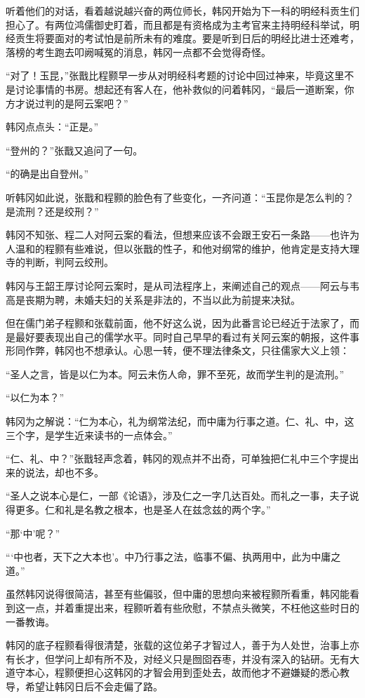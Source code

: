 听着他们的对话，看着越说越兴奋的两位师长，韩冈开始为下一科的明经科贡生们担心了。有两位鸿儒御史盯着，而且都是有资格成为主考官来主持明经科举试，明经贡生将要面对的考试怕是前所未有的难度。要是听到日后的明经比进士还难考，落榜的考生跑去叩阙喊冤的消息，韩冈一点都不会觉得奇怪。

“对了！玉昆，”张戬比程颢早一步从对明经科考题的讨论中回过神来，毕竟这里不是讨论事情的书房。想起还有客人在，他补救似的问着韩冈，“最后一道断案，你方才说过判的是阿云案吧？”

韩冈点点头：“正是。”

“登州的？”张戬又追问了一句。

“的确是出自登州。”

听韩冈如此说，张戬和程颢的脸色有了些变化，一齐问道：“玉昆你是怎么判的？是流刑？还是绞刑？”

韩冈不知张、程二人对阿云案的看法，但想来应该不会跟王安石一条路——也许为人温和的程颢有些难说，但以张戬的性子，和他对纲常的维护，他肯定是支持大理寺的判断，判阿云绞刑。

韩冈与王韶王厚讨论阿云案时，是从司法程序上，来阐述自己的观点——阿云与韦高是丧期为聘，未婚夫妇的关系是非法的，不当以此为前提来决狱。

但在儒门弟子程颢和张载前面，他不好这么说，因为此番言论已经近于法家了，而是最好要表现出自己的儒学水平。同时自己早早的看过有关阿云案的朝报，这件事形同作弊，韩冈也不想承认。心思一转，便不理法律条文，只往儒家大义上领：

“圣人之言，皆是以仁为本。阿云未伤人命，罪不至死，故而学生判的是流刑。”

“以仁为本？”

韩冈为之解说：“仁为本心，礼为纲常法纪，而中庸为行事之道。仁、礼、中，这三个字，是学生近来读书的一点体会。”

“仁、礼、中？”张戬轻声念着，韩冈的观点并不出奇，可单独把仁礼中三个字提出来的说法，却也不多。

“圣人之说本心是仁，一部《论语》，涉及仁之一字几达百处。而礼之一事，夫子说得更多。仁和礼是名教之根本，也是圣人在兹念兹的两个字。”

“那‘中’呢？”

“‘中也者，天下之大本也’。中乃行事之法，临事不偏、执两用中，此为中庸之道。”

虽然韩冈说得很简洁，甚至有些偏驳，但中庸的思想向来被程颢所看重，韩冈能看到这一点，并着重提出来，程颢听着有些欣慰，不禁点头微笑，不枉他这些时日的一番教诲。

韩冈的底子程颢看得很清楚，张载的这位弟子才智过人，善于为人处世，治事上亦有长才，但学问上却有所不及，对经义只是囫囵吞枣，并没有深入的钻研。无有大道守本心，程颢便担心这韩冈的才智会用到歪处去，故而他才不避嫌疑的悉心教导，希望让韩冈日后不会走偏了路。

